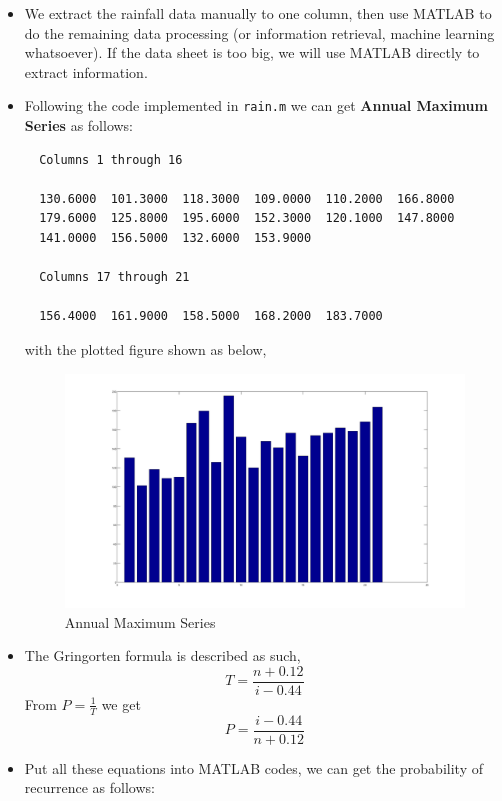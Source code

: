 \documentclass[12pt]{article}
\begin{document}
\begin{itemize}
\item We extract the rainfall data manually to one column, then use
  MATLAB to do the remaining data processing (or information
  retrieval, machine learning whatsoever). If the data sheet is too
  big, we will use MATLAB directly to extract information.
\item Following the code implemented in \texttt{rain.m} we can get
  \textbf{Annual Maximum Series} as follows:
\begin{verbatim}
  Columns 1 through 16

  130.6000  101.3000  118.3000  109.0000  110.2000  166.8000
  179.6000  125.8000  195.6000  152.3000  120.1000  147.8000
  141.0000  156.5000  132.6000  153.9000

  Columns 17 through 21

  156.4000  161.9000  158.5000  168.2000  183.7000
\end{verbatim}
  with the plotted figure shown as below,
  \begin{figure}
    \centering
    \includegraphics[angle=90,scale=0.4]{annums_bar.png}
    \caption{Annual Maximum Series}
    \label{fig:rain-ams}
  \end{figure}

\item The Gringorten formula is described as such,
  \begin{equation}
    \label{eq:6}
    T=\frac{n+0.12}{i-0.44}
  \end{equation}
  From $P=\frac{1}{T}$ we get
  \begin{equation}
    \label{eq:13}
    P=\frac{i-0.44}{n+0.12}
  \end{equation}
\item Put all these equations into MATLAB codes, we can get the
  probability of recurrence as follows:
\begin{verbatim}


\end{verbatim}
\end{itemize}
\end{document}
